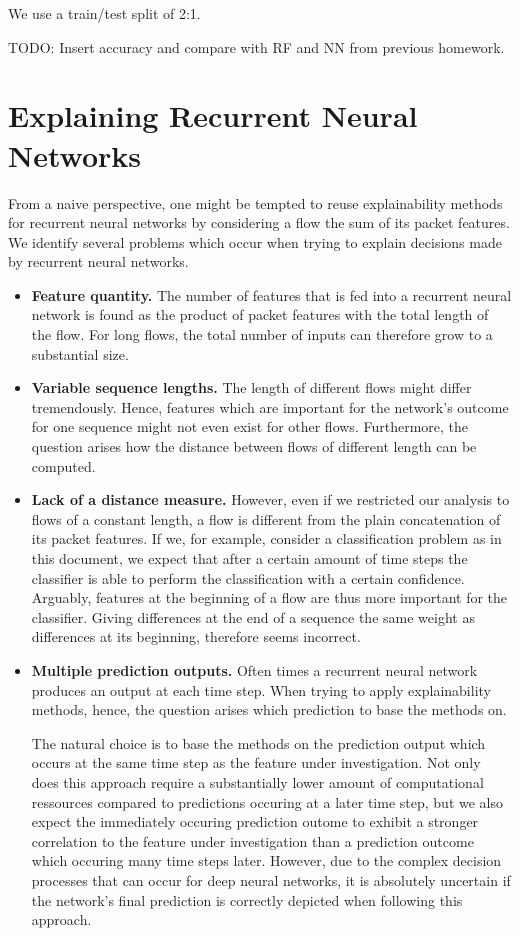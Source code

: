 \documentclass[sigconf,nonacm]{acmart}
\newcommand\note[2]{{\color{#1}#2}}
\newcommand\todo[1]{{\note{red}{TODO: #1}}}
\begin{document}
We use a train/test split of 2:1.

\todo{Insert accuracy and compare with RF and NN from previous homework.}

\section{Explaining Recurrent Neural Networks}
From a naive perspective, one might be tempted to reuse explainability methods for recurrent neural networks by considering a flow the sum of its packet features. 
We identify several problems which occur when trying to explain decisions made by recurrent neural networks.

\begin{itemize}
\item
\textbf{Feature quantity.}
The number of features that is fed into a recurrent neural network is found as the product of packet features with the total length of the flow. For long flows, the total number of inputs can therefore grow to a substantial size.

\item
\textbf{Variable sequence lengths.}
The length of different flows might differ tremendously. Hence, features which are important for the network's outcome for one sequence might not even exist for other flows. Furthermore, the question arises how the distance between flows of different length can be computed.

\item
\textbf{Lack of a distance measure.}
However, even if we restricted our analysis to flows of a constant length, a flow is different from the plain concatenation of its packet features. 
If we, for example, consider a classification problem as in this document, we expect that after a certain amount of time steps the classifier is able to perform the classification with a certain confidence. Arguably, features at the beginning of a flow are thus more important for the classifier. Giving differences at the end of a sequence the same weight as differences at its beginning, therefore seems incorrect. 

\item
\textbf{Multiple prediction outputs.}
Often times a recurrent neural network produces an output at each time step. When trying to apply explainability methods, hence, the question arises which prediction to base the methods on.

The natural choice is to base the methods on the prediction output which occurs at the same time step as the feature under investigation. Not only does this approach require a substantially lower amount of computational ressources compared to predictions occuring at a later time step, but we also expect the immediately occuring prediction outome to exhibit a stronger correlation to the feature under investigation than a prediction outcome which occuring many time steps later. However, due to the complex decision processes that can occur for deep neural networks, it is absolutely  uncertain if the network's final prediction is correctly depicted when following this approach.
\end{itemize}
\end{document}
